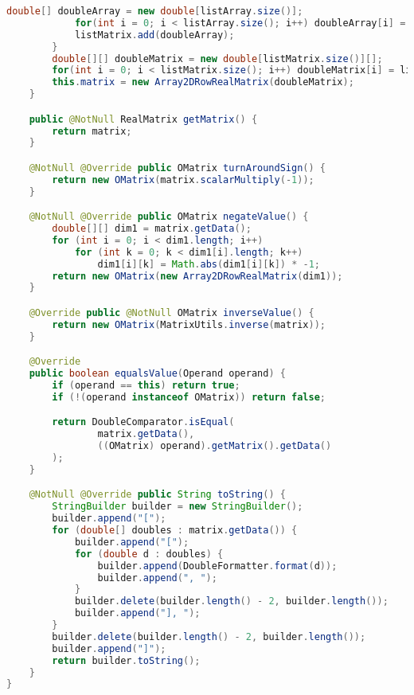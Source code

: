 \begin{lstlisting}[caption=OMatrix (Schwenke),label=list:OMatrix,language=Java]
            double[] doubleArray = new double[listArray.size()];
            for(int i = 0; i < listArray.size(); i++) doubleArray[i] = listArray.get(i);
            listMatrix.add(doubleArray);
        }
        double[][] doubleMatrix = new double[listMatrix.size()][];
        for(int i = 0; i < listMatrix.size(); i++) doubleMatrix[i] = listMatrix.get(i);
        this.matrix = new Array2DRowRealMatrix(doubleMatrix);
    }

    public @NotNull RealMatrix getMatrix() {
        return matrix;
    }

    @NotNull @Override public OMatrix turnAroundSign() {
        return new OMatrix(matrix.scalarMultiply(-1));
    }

    @NotNull @Override public OMatrix negateValue() {
        double[][] dim1 = matrix.getData();
        for (int i = 0; i < dim1.length; i++)
            for (int k = 0; k < dim1[i].length; k++)
                dim1[i][k] = Math.abs(dim1[i][k]) * -1;
        return new OMatrix(new Array2DRowRealMatrix(dim1));
    }

    @Override public @NotNull OMatrix inverseValue() {
        return new OMatrix(MatrixUtils.inverse(matrix));
    }

    @Override
    public boolean equalsValue(Operand operand) {
        if (operand == this) return true;
        if (!(operand instanceof OMatrix)) return false;

        return DoubleComparator.isEqual(
                matrix.getData(),
                ((OMatrix) operand).getMatrix().getData()
        );
    }

    @NotNull @Override public String toString() {
        StringBuilder builder = new StringBuilder();
        builder.append("[");
        for (double[] doubles : matrix.getData()) {
            builder.append("[");
            for (double d : doubles) {
                builder.append(DoubleFormatter.format(d));
                builder.append(", ");
            }
            builder.delete(builder.length() - 2, builder.length());
            builder.append("], ");
        }
        builder.delete(builder.length() - 2, builder.length());
        builder.append("]");
        return builder.toString();
    }
}
\end{lstlisting}    

